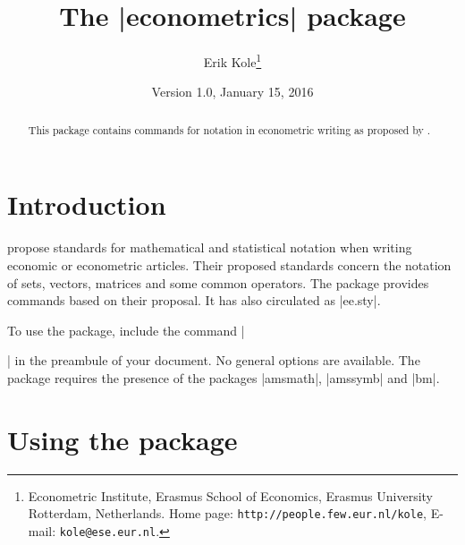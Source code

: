 \documentclass[12pt, a4paper]{ltxguide}
\title{The |econometrics| package}
\author{Erik Kole\thanks{Econometric Institute, Erasmus School of Economics, Erasmus University Rotterdam, Netherlands. Home page: \texttt{http://people.few.eur.nl/kole},  E-mail: \texttt{kole@ese.eur.nl}.}}
\date{Version 1.0, January 15, 2016}
\begin{document}
\maketitle


\begin{abstract}
\noindent This package contains commands for notation in econometric writing as proposed by \citet{Abadir02}.
\end{abstract}

\section{Introduction}
\citet{Abadir02} propose standards for mathematical and statistical notation when writing economic or econometric articles. Their proposed standards concern the notation of sets, vectors, matrices and some common operators. The package provides commands based on their proposal. It has also circulated as |ee.sty|.

To use the package, include the command |\usepackage{econometrics}| in the preambule of your document. No general options are available. The package requires the presence of the packages |amsmath|, |amssymb| and |bm|.

\section{Using the package}
\end{document}
